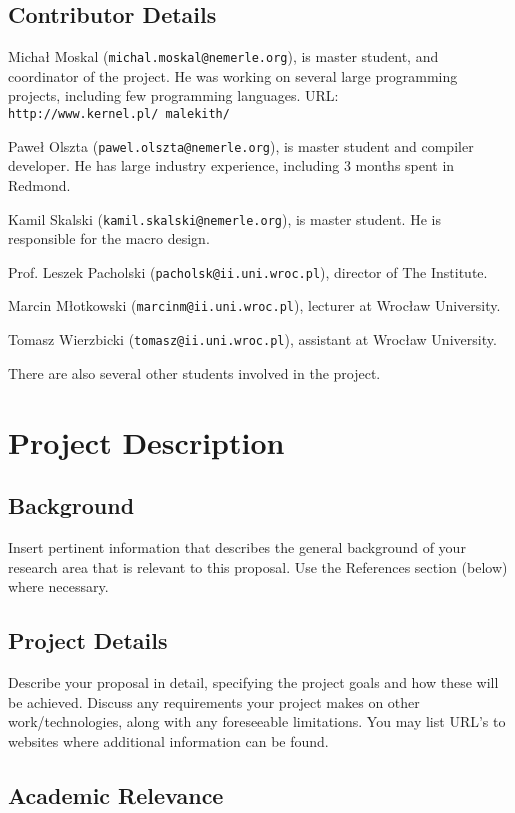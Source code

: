 \documentclass[a4paper,11pt]{article}
\begin{document}
\subsection{Contributor Details}

Micha{\l} Moskal (\texttt{michal.moskal@nemerle.org}), is master
student, and coordinator of the project. He was working on several large
programming projects, including few programming languages. URL: 
\texttt{http://www.kernel.pl/~malekith/}

Pawe{\l} Olszta (\texttt{pawel.olszta@nemerle.org}), is master student
and compiler developer. He has large industry experience, including
3 months spent in Redmond. 

Kamil Skalski (\texttt{kamil.skalski@nemerle.org}), is master student.
He is responsible for the macro design.

Prof. Leszek Pacholski (\texttt{pacholsk@ii.uni.wroc.pl}), director of The Institute.

Marcin M\l otkowski (\texttt{marcinm@ii.uni.wroc.pl}), lecturer at Wroc\l aw University.

Tomasz Wierzbicki (\texttt{tomasz@ii.uni.wroc.pl}), assistant at Wroc\l aw University.

There are also several other students involved in the project.


\section{Project Description}
\subsection{Background}
Insert pertinent information that describes the general background of
your research area that is relevant to this proposal. Use the References
section (below) where necessary.


\subsection{Project Details}

Describe your proposal in detail, specifying the project goals and how
these will be achieved. Discuss any requirements your project makes on
other work/technologies, along with any foreseeable limitations. You
may list URL's to websites where additional information can be found.


\subsection{Academic Relevance}
\end{document}
